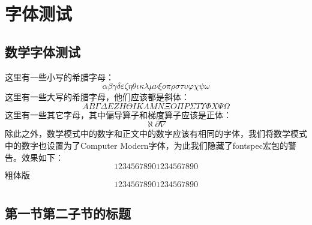 
\section{字体测试}

\zhlipsum[1]

\subsection{数学字体测试}

这里有一些小写的希腊字母：
\begin{equation}
  \alpha \beta \gamma \delta \varepsilon \zeta \eta \theta \iota \kappa \lambda \mu \nu \xi o \pi \rho \sigma \tau \upsilon \varphi \chi \psi \omega
\end{equation}
这里有一些大写的希腊字母，他们应该都是斜体：
\begin{equation}
  A B \Gamma \Delta E Z H \Theta I K \Lambda M N \Xi O \Pi P \Sigma T \Upsilon \varPhi X \Psi \Omega
\end{equation}
这里有一些其它字母，其中偏导算子和梯度算子应该是正体：
\begin{equation}
  \aleph \partial \nabla
\end{equation}
除此之外，数学模式中的数字和正文中的数字应该有相同的字体，我们将数学模式中的数字也设置为了Computer Modern字体，为此我们隐藏了fontspec宏包的警告。效果如下：
\begin{equation}
  1234567890\text{1234567890}
\end{equation}
粗体版{\bf
  \begin{equation}
    1234567890\text{1234567890}
  \end{equation}
}

\zhlipsum[1]

\subsection{第一节第二子节的标题}

\zhlipsum
